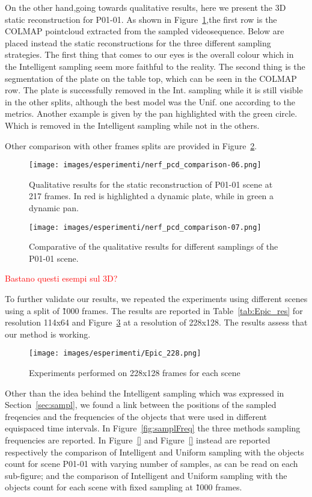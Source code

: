 On the other hand,going towards qualitative results, here we present the 3D static reconstruction for P01-01.
As shown in Figure~\ref{fig:statP01_01},the first row is the COLMAP pointcloud extracted from the sampled videosequence. Below are placed
instead the static reconstructions for the three different sampling strategies. The first thing that comes to our eyes is 
the overall colour which in the Intelligent sampling seem more faithful to the reality. The second thing is the segmentation of 
the plate on the table top, which can be seen in the COLMAP row. The plate is successfully removed in the Int. sampling while
it is still visible in the other splits, although the best model was the Unif. one according to the metrics. Another example 
is given by the pan highlighted with the green circle. Which is removed in the Intelligent sampling while not in the others.

Other comparison with other frames splits are provided in Figure~\ref{fig:statP01_02}.
\begin{figure}[H]
    \centering
    \texttt{[image: images/esperimenti/nerf\_pcd\_comparison-06.png]} 
    \caption{Qualitative results for the static reconstruction of P01-01 scene at 217 frames. In red is highlighted
            a dynamic plate, while in green a dynamic pan.}\label{fig:statP01_01}
\end{figure}
\begin{figure}
    
     {\texttt{[image: images/esperimenti/nerf\_pcd\_comparison-07.png]} }
    \caption{Comparative of the qualitative results for different samplings of the P01-01 scene.}\label{fig:statP01_02}
\end{figure}
\textcolor{red}{Bastano questi esempi sul 3D?}

To further validate our results, we repeated the experiments using different scenes using a split of \~1000 frames.
 The results are reported in Table~\ref{tab:Epic_res} for resolution 114x64 and Figure~\ref{fig:Epic228} at 
 a resolution of 228x128. The results assess that our method is working.


\begin{figure}[t]
    \centering
    \texttt{[image: images/esperimenti/Epic\_228.png]} 
    \caption{Experiments performed on 228x128 frames for each scene}\label{fig:Epic228}
\end{figure}
Other than the idea behind the Intelligent sampling which was expressed in Section~\ref{sec:sampl}, we found a
link between the positions of the sampled freqencies and the frequencies of the objects that were used in different 
equispaced time intervals. In Figure~\ref{fig:samplFreq} the three methods sampling 
frequencies are reported. In Figure~\ref{} and Figure~\ref{} instead are reported respectively
the comparison of Intelligent and Uniform sampling with the objects count for scene P01-01 with varying number of samples,
as can be read on each sub-figure; and the comparison of Intelligent and Uniform sampling with the objects count for each scene
with fixed sampling at \~1000 frames.

